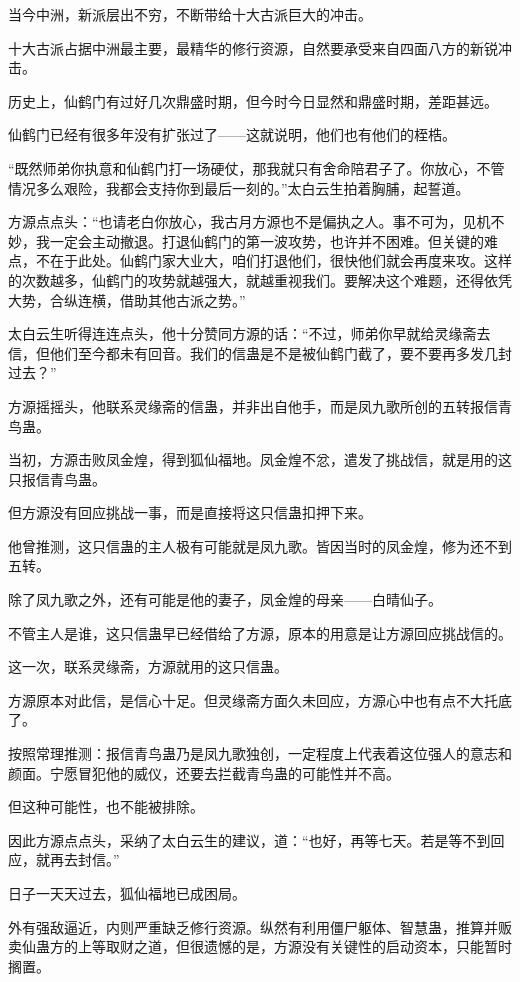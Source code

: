 \begin{this_body}
当今中洲，新派层出不穷，不断带给十大古派巨大的冲击。

十大古派占据中洲最主要，最精华的修行资源，自然要承受来自四面八方的新锐冲击。

历史上，仙鹤门有过好几次鼎盛时期，但今时今日显然和鼎盛时期，差距甚远。

仙鹤门已经有很多年没有扩张过了——这就说明，他们也有他们的桎梏。

“既然师弟你执意和仙鹤门打一场硬仗，那我就只有舍命陪君子了。你放心，不管情况多么艰险，我都会支持你到最后一刻的。”太白云生拍着胸脯，起誓道。

方源点点头：“也请老白你放心，我古月方源也不是偏执之人。事不可为，见机不妙，我一定会主动撤退。打退仙鹤门的第一波攻势，也许并不困难。但关键的难点，不在于此处。仙鹤门家大业大，咱们打退他们，很快他们就会再度来攻。这样的次数越多，仙鹤门的攻势就越强大，就越重视我们。要解决这个难题，还得依凭大势，合纵连横，借助其他古派之势。”

太白云生听得连连点头，他十分赞同方源的话：“不过，师弟你早就给灵缘斋去信，但他们至今都未有回音。我们的信蛊是不是被仙鹤门截了，要不要再多发几封过去？”

方源摇摇头，他联系灵缘斋的信蛊，并非出自他手，而是凤九歌所创的五转报信青鸟蛊。

当初，方源击败凤金煌，得到狐仙福地。凤金煌不忿，遣发了挑战信，就是用的这只报信青鸟蛊。

但方源没有回应挑战一事，而是直接将这只信蛊扣押下来。

他曾推测，这只信蛊的主人极有可能就是凤九歌。皆因当时的凤金煌，修为还不到五转。

除了凤九歌之外，还有可能是他的妻子，凤金煌的母亲——白晴仙子。

不管主人是谁，这只信蛊早已经借给了方源，原本的用意是让方源回应挑战信的。

这一次，联系灵缘斋，方源就用的这只信蛊。

方源原本对此信，是信心十足。但灵缘斋方面久未回应，方源心中也有点不大托底了。

按照常理推测：报信青鸟蛊乃是凤九歌独创，一定程度上代表着这位强人的意志和颜面。宁愿冒犯他的威仪，还要去拦截青鸟蛊的可能性并不高。

但这种可能性，也不能被排除。

因此方源点点头，采纳了太白云生的建议，道：“也好，再等七天。若是等不到回应，就再去封信。”

日子一天天过去，狐仙福地已成困局。

外有强敌逼近，内则严重缺乏修行资源。纵然有利用僵尸躯体、智慧蛊，推算并贩卖仙蛊方的上等取财之道，但很遗憾的是，方源没有关键性的启动资本，只能暂时搁置。


\end{this_body}
